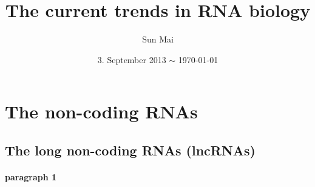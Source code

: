 \documentclass[a4paper, 11pt]{article}
\begin{document}
\title{The current trends in RNA biology}
\author{Sun Mai}
\date{3. September 2013 $\sim$ \today}
\maketitle

\pagestyle{fancy}
\fancyhead{}
\fancyhead[R]{\slshape \leftmark}
\fancyfoot[C]{\thepage}

\newpage
\tableofcontents

\newpage
\sloppy
\section{The non-coding RNAs}
	\subsection{The long non-coding RNAs (lncRNAs)}
		\paragraph{paragraph 1}



\end{document}

